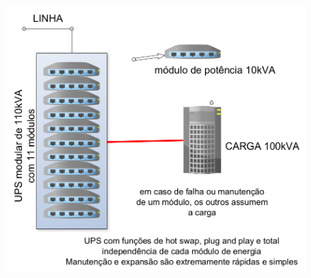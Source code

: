 \begin{enumerate}
\begin{figure}[H]
\begin{minipage}{0.45\textwidth}
			\label{fig: redundancia3}
		\end{minipage}
		\begin{minipage}{0.45\textwidth}
			\centering
			\includegraphics[width=\textwidth]{Figures/7. nobreak/redundancia4.png}
			\label{fig: redundancia4}
		\end{minipage}
	\end{figure}

\end{enumerate}